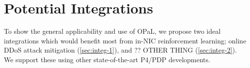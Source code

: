 \documentclass[sigconf,natbib=false]{acmart}
\newcommand{\approachshort}{OPaL}
\begin{document}
%		
%		
%		
%		
%		
%		
%		
%		
%		

\section{Potential Integrations}\label{sec:potential-integrations}
To show the general applicability and use of \approachshort{}, we propose two ideal integrations which would benefit most from in-NIC reinforcement learning; online DDoS attack mitigation (\cref{sec:integ-1}), and ?? OTHER THING (\cref{sec:integ-2}).
We support these using other state-of-the-art P4/PDP developments.
\end{document}
